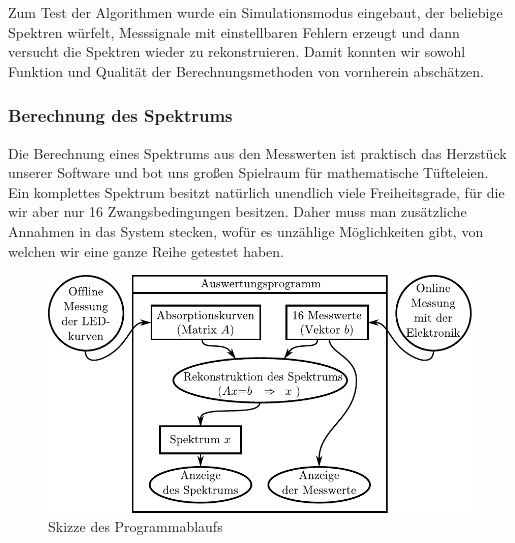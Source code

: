 \documentclass[11pt]{scrartcl}
\begin{document}
Zum Test der Algorithmen wurde ein Simulationsmodus eingebaut, der beliebige Spektren würfelt, Messsignale mit einstellbaren Fehlern erzeugt und dann versucht die Spektren wieder zu rekonstruieren.
Damit konnten wir sowohl Funktion und Qualität der Berechnungsmethoden von vornherein abschätzen.

\subsubsection{Berechnung des Spektrums}
Die Berechnung eines Spektrums aus den Messwerten ist praktisch das Herzstück unserer Software und bot uns großen Spielraum für mathematische Tüfteleien.
Ein komplettes Spektrum besitzt natürlich unendlich viele Freiheitsgrade, für die wir aber nur 16 Zwangsbedingungen besitzen.
Daher muss man zusätzliche Annahmen in das System stecken, wofür es unzählige Möglichkeiten gibt, von welchen wir eine ganze Reihe getestet haben.

\begin{figure}[H]
\begin{center}
\includegraphics[width=1\textwidth]{programmablauf.pdf}
\end{center}
\vspace{-1.5\baselineskip}
\caption{Skizze des Programmablaufs}
\label{fig:programmablauf}
\end{figure}
\end{document}

